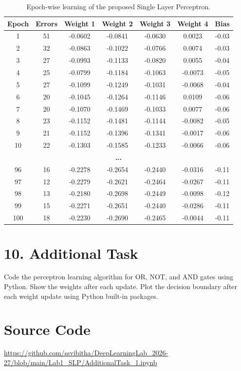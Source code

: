\documentclass[11pt]{article}
\begin{document}
\begin{table}[H]
\centering
\begin{tabular}{|c|c|c|c|c|c|c|}
\hline
\textbf{Epoch} & \textbf{Errors} & \textbf{Weight 1} & \textbf{Weight 2} & \textbf{Weight 3} & \textbf{Weight 4} & \textbf{Bias} \\
\hline
1  & 51 & -0.0602 & -0.0841 & -0.0630 &  0.0023 & -0.03 \\
2  & 32 & -0.0863 & -0.1022 & -0.0766 &  0.0074 & -0.03 \\
3  & 27 & -0.0993 & -0.1133 & -0.0820 &  0.0055 & -0.04 \\
4  & 25 & -0.0799 & -0.1184 & -0.1063 & -0.0073 & -0.05 \\
5  & 27 & -0.1099 & -0.1249 & -0.1031 & -0.0068 & -0.04 \\
6  & 20 & -0.1045 & -0.1264 & -0.1146 &  0.0109 & -0.06 \\
7  & 20 & -0.1070 & -0.1469 & -0.1033 &  0.0077 & -0.06 \\
8  & 23 & -0.1152 & -0.1481 & -0.1144 & -0.0082 & -0.05 \\
9  & 21 & -0.1152 & -0.1396 & -0.1341 & -0.0017 & -0.06 \\
10 & 22 & -0.1303 & -0.1585 & -0.1233 & -0.0066 & -0.06 \\
\hline
\multicolumn{7}{|c|}{\textbf{...}}\\
\hline
96 & 16 & -0.2278 & -0.2654 & -0.2440 & -0.0316 & -0.11 \\
97 & 12 & -0.2279 & -0.2621 & -0.2464 & -0.0267 & -0.11 \\
98 & 13 & -0.2180 & -0.2698 & -0.2449 & -0.0098 & -0.12 \\
99 & 15 & -0.2271 & -0.2651 & -0.2440 & -0.0286 & -0.11 \\
100 & 18 & -0.2230 & -0.2690 & -0.2465 & -0.0044 & -0.11 \\
\hline
\end{tabular}
\caption{Epoch-wise learning of the proposed Single Layer Perceptron.}
\end{table}

\clearpage
\section*{10. Additional Task}
Code the perceptron learning algorithm for OR, NOT, and AND gates using Python. Show the weights after each update. Plot the decision boundary after each weight update using Python built-in packages.
\section*{Source Code}
\url{https://github.com/ssvibitha/DeepLearningLab_2026-27/blob/main/Lab1_SLP/AdditionalTask_1.ipynb}
\end{document}
